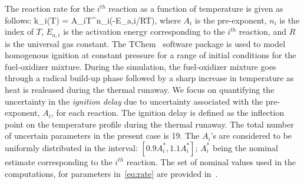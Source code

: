 The reaction rate for the $i^{th}$ reaction as a function of temperature
is given as follows:
\be
k_i(T) = A_iT^{n_i}\exp(-E_{a,i}/RT), 
\label{eq:rate}
\ee
%
where $A_i$ is the pre-exponent, $n_i$ is the index of $T$, $E_{a,i}$ is the
activation energy corresponding to the $i^{th}$ reaction, and $R$ is the
universal gas constant. 
The TChem~\cite{Safta:2011} software package is used to model homogenous
ignition at constant pressure for a range of initial conditions for the
fuel-oxidizer mixture. During the simulation, the fuel-oxidizer mixture goes 
through a radical build-up phase followed by a sharp increase in temperature
as heat is realeased during the thermal runaway. We focus on quantifying the 
uncertainty in the \emph{ignition delay} due to uncertainty associated 
with the pre-exponent, $A_i$, for each reaction. The ignition delay 
is defined as the inflection point on the temperature profile during the thermal
runaway. The total number of uncertain parameters in the
present case is 19.  The $A_i$'s are considered to be uniformly distributed in
the interval: $[0.9A_i^\ast, 1.1A_i^\ast]$; $A_i^\ast$ being the nominal
estimate corresponding to the $i^{th}$ reaction.
The set of nominal values used in the computations, for parameters 
in~\eqref{eq:rate} are provided
in~\cite{Yetter:1991}. 

